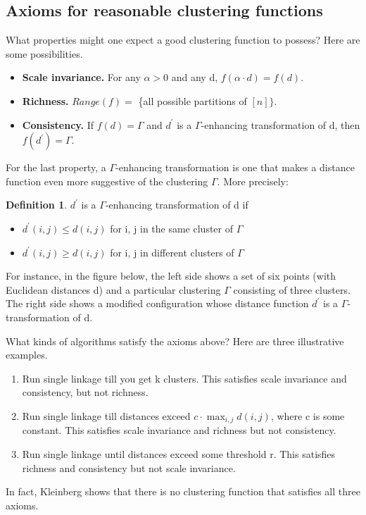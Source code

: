 \documentclass[letterpaper,10pt]{article}
\theoremstyle{definition}
\newtheorem{definition}{Definition}
\theoremstyle{plain}
\begin{document}
\subsection{Axioms for reasonable clustering functions}
What properties might one expect a good clustering function to possess? Here are some possibilities.
\begin{itemize}
    \item \textbf{Scale invariance.} For any $\alpha>0$ and any d, $f(\alpha\cdot d)=f(d)$.
    \item \textbf{Richness.} $Range(f)=$ \{all possible partitions of $[n]\}$.
    \item \textbf{Consistency.} If $f(d)=\Gamma$ and $d^{\prime}$ is a $\Gamma$-enhancing transformation of d, then $f(d^{\prime})=\Gamma.$
\end{itemize}
For the last property, a $\Gamma$-enhancing transformation is one that makes a distance function even more suggestive of the clustering $\Gamma$. More precisely:

\begin{definition}
$d^{\prime}$ is a $\Gamma$-enhancing transformation of d if
\begin{itemize}
    \item $d^{\prime}(i,j)\le d(i,j)$ for i, j in the same cluster of $\Gamma$
    \item $d^{\prime}(i,j)\ge d(i,j)$ for i, j in different clusters of $\Gamma$
\end{itemize}
\end{definition}

For instance, in the figure below, the left side shows a set of six points (with Euclidean distances d) and a particular clustering $\Gamma$ consisting of three clusters. The right side shows a modified configuration whose distance function $d^{\prime}$ is a $\Gamma$-transformation of d.


What kinds of algorithms satisfy the axioms above? Here are three illustrative examples.
\begin{enumerate}
    \item Run single linkage till you get k clusters. This satisfies scale invariance and consistency, but not richness.
    \item Run single linkage till distances exceed $c\cdot \max_{i,j}d(i,j)$, where c is some constant. This satisfies scale invariance and richness but not consistency.
    \item Run single linkage until distances exceed some threshold r. This satisfies richness and consistency but not scale invariance.
\end{enumerate}
In fact, Kleinberg shows that there is no clustering function that satisfies all three axioms.
\end{document}
